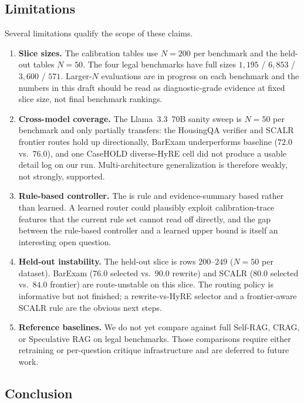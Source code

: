 \subsection{Limitations}

Several limitations qualify the scope of these claims.
\begin{enumerate}
\item \textbf{Slice sizes.} The calibration tables use $N{=}200$ per
benchmark and the held-out tables $N{=}50$. The four legal benchmarks have
full sizes $1{,}195$ / $6{,}853$ / $3{,}600$ / $571$. Larger-$N$
evaluations are in progress on each benchmark and the numbers in this draft
should be read as diagnostic-grade evidence at fixed slice size, not final
benchmark rankings.
\item \textbf{Cross-model coverage.} The Llama~3.3~70B sanity sweep is
$N{=}50$ per benchmark and only partially transfers: the HousingQA
verifier and SCALR frontier routes hold up directionally, BarExam
 underperforms baseline ($72.0$ vs.\ $76.0$), and one
CaseHOLD diverse-HyRE cell did not produce a usable detail log on our run.
Multi-architecture generalization is therefore weakly, not strongly,
supported.
\item \textbf{Rule-based controller.} The \controller{} is rule and
evidence-summary based rather than learned. A learned router could plausibly
exploit calibration-trace features that the current rule set cannot read
off directly, and the gap between the rule-based controller and a learned
upper bound is itself an interesting open question.
\item \textbf{Held-out instability.} The held-out slice is rows $200$--$249$
($N{=}50$ per dataset). BarExam ($76.0$ selected vs.\ $90.0$ rewrite) and
SCALR ($80.0$ selected vs.\ $84.0$ frontier) are route-unstable on this
slice. The routing policy is informative but not finished; a rewrite-vs-HyRE
selector and a frontier-aware SCALR rule are the obvious next steps.
\item \textbf{Reference baselines.} We do not yet compare against full
\citet{asai2024selfrag} Self-RAG, \citet{yan2024crag} CRAG, or
\citet{wang2025specrag} Speculative RAG on legal benchmarks. Those
comparisons require either retraining or per-question critique
infrastructure and are deferred to future work.
\end{enumerate}

\subsection{Conclusion}

